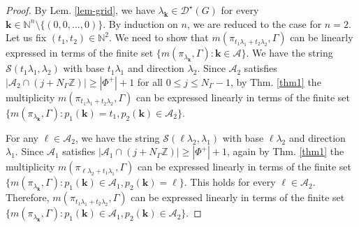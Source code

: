 \documentclass[11 pt]{amsart}
\newcommand{\Z}{{\mathbb Z}}
\newcommand{\N}{{\mathbb N}}
\theoremstyle{definition}
\numberwithin{equation}{section}
\begin{document}
\begin{proof}

By Lem. \ref{lem-grid}, we have $\lambda_{\boldsymbol{k}} \in \mathcal{D}^{\star}(G)$ for every $\boldsymbol{k} \in \N^n \setminus \{(0,0, \dots ,0)\}$. By induction on $n$, we are reduced to the case for $n=2$. Let us fix $(t_1, t_2) \in \N^2$. We need to show that $m(\pi_{t_1 \lambda_1 + t_2 \lambda_2}, \Gamma)$ can be linearly expressed in terms of the finite set $\{ m(\pi_{\lambda_{\boldsymbol{k}}}, \Gamma) : \boldsymbol{k} \in \boldsymbol{\mathcal{A}}\}$. We have the string $\mathcal{S}(t_1 \lambda_1, \lambda_2)$ with base $t_1 \lambda_1$ and direction $\lambda_2$. Since $\mathcal{A}_2$ satisfies $| \mathcal{A}_2  \cap (j + N_{\Gamma} \Z) | \geq |\Phi^+|+1$ for all $ 0 \leq j \leq N_{\Gamma}-1$, by Thm. \ref{thm1} the multiplicity $m(\pi_{t_1 \lambda_1 + t_2 \lambda_2}, \Gamma)$ can be expressed linearly in terms of the finite set $\{ m(\pi_{\lambda_{\boldsymbol{k}}}, \Gamma) : p_1 (\boldsymbol{k})=t_1 , p_2 (\boldsymbol{k}) \in \mathcal{A}_2 \}.$

\noindent For any $\ell \in \mathcal{A}_2$, we have the string $\mathcal{S}(\ell \lambda_2, \lambda_1)$ with base $ \ell \lambda_2$ and direction $\lambda_1$. Since $\mathcal{A}_1$ satisfies $| \mathcal{A}_1  \cap (j + N_{\Gamma} \Z) | \geq |\Phi^+|+1$, again by Thm. \ref{thm1} the multiplicity $m(\pi_{ \ell \lambda_2 + t_1 \lambda_1}, \Gamma)$ can be expressed linearly in terms of the finite set $\{ m(\pi_{\lambda_{\boldsymbol{k}}}, \Gamma) : p_1 (\boldsymbol{k}) \in \mathcal{A}_1, p_2 (\boldsymbol{k})=\ell \}$. This holds for every $\ell \in \mathcal{A}_2$. Therefore, $m(\pi_{t_1 \lambda_1 + t_2 \lambda_2}, \Gamma)$ can be expressed linearly in terms of the finite set $\{ m(\pi_{\lambda_{\boldsymbol{k}}}, \Gamma) : p_1(\boldsymbol{k}) \in \mathcal{A}_1, p_2 (\boldsymbol{k}) \in \mathcal{A}_2\}$.
\end{proof}
\end{document}
